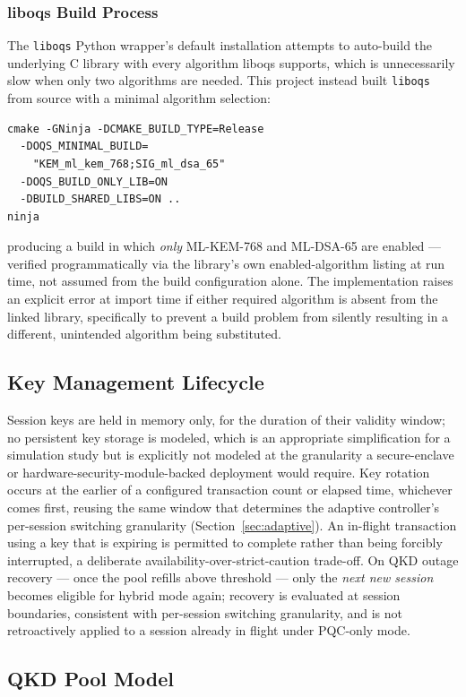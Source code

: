\documentclass[journal]{IEEEtran}
\begin{document}
\subsubsection{liboqs Build Process}
The \texttt{liboqs} Python wrapper's default installation attempts to auto-build the underlying C library with every algorithm liboqs supports, which is unnecessarily slow when only two algorithms are needed. This project instead built \texttt{liboqs} from source with a minimal algorithm selection:
\begin{verbatim}
cmake -GNinja -DCMAKE_BUILD_TYPE=Release
  -DOQS_MINIMAL_BUILD=
    "KEM_ml_kem_768;SIG_ml_dsa_65"
  -DOQS_BUILD_ONLY_LIB=ON
  -DBUILD_SHARED_LIBS=ON ..
ninja
\end{verbatim}
producing a build in which \emph{only} ML-KEM-768 and ML-DSA-65 are enabled --- verified programmatically via the library's own enabled-algorithm listing at run time, not assumed from the build configuration alone. The implementation raises an explicit error at import time if either required algorithm is absent from the linked library, specifically to prevent a build problem from silently resulting in a different, unintended algorithm being substituted.

\subsection{Key Management Lifecycle}

Session keys are held in memory only, for the duration of their validity window; no persistent key storage is modeled, which is an appropriate simplification for a simulation study but is explicitly not modeled at the granularity a secure-enclave or hardware-security-module-backed deployment would require. Key rotation occurs at the earlier of a configured transaction count or elapsed time, whichever comes first, reusing the same window that determines the adaptive controller's per-session switching granularity (Section~\ref{sec:adaptive}). An in-flight transaction using a key that is expiring is permitted to complete rather than being forcibly interrupted, a deliberate availability-over-strict-caution trade-off. On QKD outage recovery --- once the pool refills above threshold --- only the \emph{next new session} becomes eligible for hybrid mode again; recovery is evaluated at session boundaries, consistent with per-session switching granularity, and is not retroactively applied to a session already in flight under PQC-only mode.

\subsection{QKD Pool Model}
\label{sec:qkdmodel}
\end{document}
